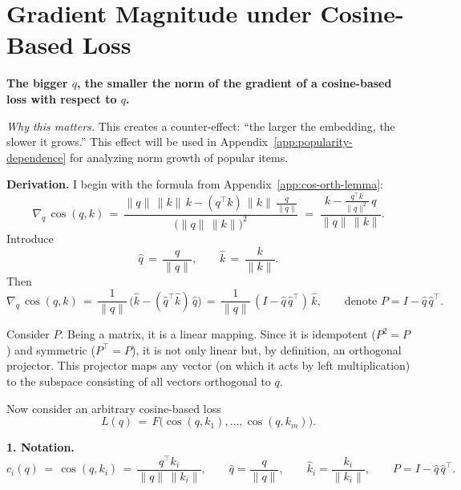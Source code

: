 \section{Gradient Magnitude under Cosine-Based Loss}
\label{app:cosine-growth-rate}

\textbf{The bigger $q$, the smaller the norm of the gradient of a cosine-based loss with respect to $q$.}

\emph{Why this matters.} This creates a counter-effect: “the larger the embedding, the slower it grows.” This effect will be used in Appendix~\ref{app:popularity-dependence} for analyzing norm growth of popular items.

\medskip
\noindent\textbf{Derivation.} I begin with the formula from Appendix~\ref{app:cos-orth-lemma}:
\begin{equation}
\label{eq:grad-cos-base}
\nabla_{q}\,\cos(q,k) \,=\, \frac{\|q\|\,\|k\|\,k - (q^{\!\top}k)\,\|k\|\,\tfrac{q}{\|q\|}}{\bigl(\|q\|\,\|k\|\bigr)^2}
\;=\; \frac{k - \tfrac{q^{\!\top}k}{\|q\|^2}\,q}{\|q\|\,\|k\|}.
\end{equation}
Introduce
\begin{equation}
\hat q \,=\, \frac{q}{\|q\|},\qquad \hat k \,=\, \frac{k}{\|k\|}.
\end{equation}
Then
\begin{equation}
\nabla_{q}\,\cos(q,k) \,=\, \frac{1}{\|q\|}\,\bigl(\hat k - (\hat q^{\!\top}\hat k)\,\hat q\bigr) \,=\, \frac{1}{\|q\|}\,(I - \hat q\,\hat q^{\!\top})\,\hat k,\qquad \text{denote } P = I - \hat q\,\hat q^{\!\top}.
\end{equation}

Consider $P$. Being a matrix, it is a linear mapping. Since it is idempotent ($P^2=P$) and symmetric ($P^{\!\top}=P$), it is not only linear but, by definition, an orthogonal projector. This projector maps any vector (on which it acts by left multiplication) to the subspace consisting of all vectors orthogonal to $q$.

Now consider an arbitrary cosine-based loss
\begin{equation}
L(q) \,=\, F\big(\cos(q,k_1),\dots,\cos(q,k_m)\big).
\end{equation}

\noindent\textbf{1. Notation.}
\begin{equation}
c_i(q) \,=\, \cos(q,k_i) \,=\, \frac{q^{\!\top}k_i}{\|q\|\,\|k_i\|},\qquad \hat q = \frac{q}{\|q\|},\qquad \hat k_i = \frac{k_i}{\|k_i\|},\qquad P = I - \hat q\,\hat q^{\!\top}.
\end{equation}

